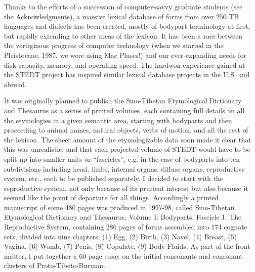 {Thanks to the efforts of a succession of computer-savvy graduate students (see the Acknowledgments), a massive lexical database of forms from over 250 TB languages and dialects has been created, mostly of bodypart terminology at first, but rapidly extending to other areas of the lexicon. It has been a race between the vertiginous progress of computer technology (when we started in the Pleistocene, 1987, we were using Mac Pluses!) and our ever-expanding needs for disk capacity, memory, and operating speed. The hardwon experience gained at the STEDT project has inspired similar lexical database projects in the U.S. and abroad.

It was originally planned to publish the Sino-Tibetan Etymological Dictionary and Thesaurus as a series of printed volumes, each containing full details on all the etymologies in a given semantic area, starting with bodyparts and then proceeding to animal names, natural objects, verbs of motion, and all the rest of the lexicon. The sheer amount of the etymologizable data soon made it clear that this was unrealistic, and that each projected volume of STEDT would have to be split up into smaller units or ``fascicles'', e.g. in the case of bodyparts into ten subdivisions including head, limbs, internal organs, diffuse organs, reproductive system, etc., each to be published separately. I decided to start with the reproductive system, not only because of its prurient interest but also because it seemed like the point of departure for all things. Accordingly a printed manuscript of some 480 pages was produced in 1997-98, called Sino-Tibetan Etymological Dictionary and Thesaurus, Volume I: Bodyparts, Fascicle 1: The Reproductive System, containing 286 pages of forms assembled into 174 cognate sets, divided into nine chapters: (1) Egg, (2) Birth, (3) Navel, (4) Breast, (5) Vagina, (6) Womb, (7) Penis, (8) Copulate, (9) Body Fluids. As part of the front matter, I put together a 60 page essay on the initial consonants and consonant clusters of Proto-Tibeto-Burman.}


